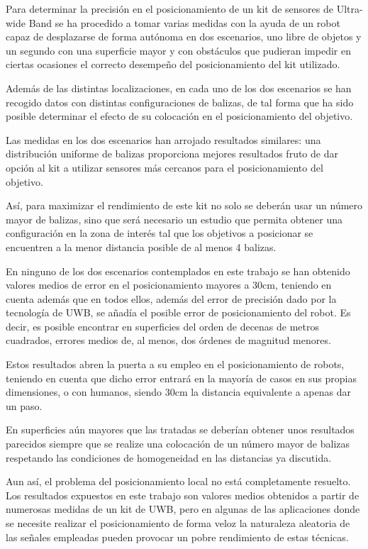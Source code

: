 Para determinar la precisión en el posicionamiento de un kit de sensores de Ultra-wide Band se ha procedido a tomar varias medidas con la ayuda de un robot capaz de desplazarse de forma autónoma en dos escenarios, uno libre de objetos y un segundo con una superficie mayor y con obstáculos que pudieran impedir en ciertas ocasiones el correcto desempeño del posicionamiento del kit utilizado.

Además de las distintas localizaciones, en cada uno de los dos escenarios se han recogido datos con distintas configuraciones de balizas, de tal forma que ha sido posible determinar el efecto de su colocación en el posicionamiento del objetivo.

Las medidas en los dos escenarios han arrojado resultados similares: una distribución uniforme de balizas proporciona mejores resultados fruto de dar opción al kit a utilizar sensores más cercanos para el posicionamiento del objetivo.

Así, para maximizar el rendimiento de este kit no solo se deberán usar un número mayor de balizas, sino que será necesario un estudio que permita obtener una configuración en la zona de interés tal que los objetivos a posicionar se encuentren a la menor distancia posible de al menos 4 balizas.

En ninguno de los dos escenarios contemplados en este trabajo se han obtenido valores medios de error en el posicionamiento mayores a 30cm, teniendo en cuenta además que en todos ellos, además del error de precisión dado por la tecnología de UWB, se añadía el posible error de posicionamiento del robot.
Es decir, es posible encontrar en superficies del orden de decenas de metros cuadrados, errores medios de, al menos, dos órdenes de magnitud menores.

Estos resultados abren la puerta a su empleo en el posicionamiento de robots, teniendo en cuenta que dicho error entrará en la mayoría de casos en sus propias dimensiones, o con humanos, siendo 30cm la distancia equivalente a apenas dar un paso.

En superficies aún mayores que las tratadas se deberían obtener unos resultados parecidos siempre que se realize una colocación de un número mayor de balizas respetando las condiciones de homogeneidad en las distancias ya discutida.

Aun así, el problema del posicionamiento local no está completamente resuelto.
Los resultados expuestos en este trabajo son valores medios obtenidos a partir de numerosas medidas de un kit de UWB, pero en algunas de las aplicaciones donde se necesite realizar el posicionamiento de forma veloz la naturaleza aleatoria de las señales empleadas pueden provocar un pobre rendimiento de estas técnicas.


